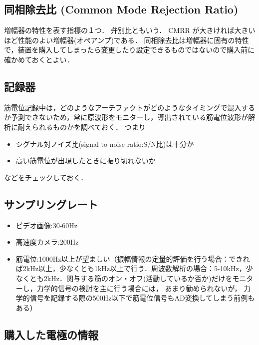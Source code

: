 \documentclass[10pt,twocolumn]{jarticle}
\begin{document}
\subsection{同相除去比 (Common Mode Rejection Ratio)}

増幅器の特性を表す指標の１つ．
弁別比ともいう．
CMRR が大きければ大きいほど性能のよい増幅器(オペアンプ)である．
同相除去比は増幅器に固有の特性で，装置を購入してしまったら変更したり設定できるものではないので購入前に確かめておくとよい．

\subsection{記録器}

筋電位記録中は，どのようなアーチファクトがどのようなタイミングで混入するか予測できないため，常に原波形をモニターし，導出されている筋電位波形が解析に耐えられるものかを調べておく．
つまり
\begin{itemize}
\item シグナル対ノイズ比(signal to noise ratio:S/N比)は十分か
\item 高い筋電位が出現したときに振り切れないか
\end{itemize}
などをチェックしておく．

\subsection{サンプリングレート}

\begin{itemize}
\item ビデオ画像:30-60Hz
\item 高速度カメラ:200Hz
\item 筋電位:1000Hz以上が望ましい（振幅情報の定量的評価を行う場合：できれば2kHz以上，少なくとも1kHz以上で行う．周波数解析の場合：5-10kHz，少なくとも2kHz．関与する筋のオン・オフ(活動しているか否か)だけをモニターし，力学的信号の検討を主に行う場合には，
あまり勧められないが，
力学的信号を記録する際の500Hz以下で筋電位信号もAD変換してしまう前例もある）
\end{itemize}

\subsection{購入した電極の情報}
\end{document}
